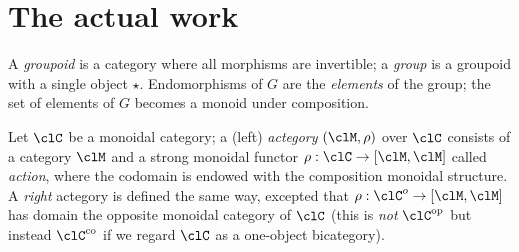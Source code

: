 

\section{The actual work}
\begin{definition}[Groupoid]
A \emph{groupoid} is a category where all morphisms are invertible; a \emph{group} is a groupoid with a single object $\star$. Endomorphisms of $G$ are the \emph{elements} of the group; the set of elements of $G$ becomes a monoid under composition.
\end{definition}
\begin{definition}[Actegory]\label{actegory}
	Let $\clC$ be a monoidal category; a (left) \emph{actegory} $(\clM,\rho)$ over $\clC$ consists of a category $\clM$ and a strong monoidal functor $\rho : \clC \to [\clM,\clM]$ called \emph{action}, where the codomain is endowed with the composition monoidal structure. A \emph{right} actegory is defined the same way, excepted that $\rho : \clC^o \to [\clM,\clM]$ has domain the opposite monoidal category of $\clC$ (this is \emph{not} $\clC^\op$ but instead $\clC^\text{co}$ if we regard $\clC$ as a one\hyp{}object bicategory).
\end{definition}
